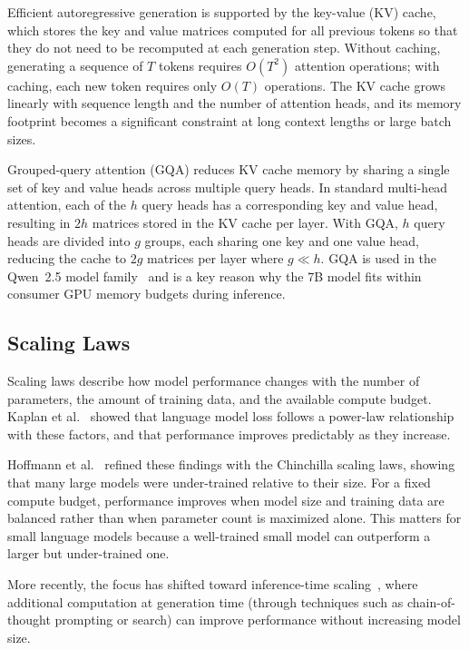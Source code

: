 Efficient autoregressive generation is supported by the key-value
(KV) cache, which stores the key and value matrices computed for all
previous tokens so that they do not need to be recomputed at each
generation step. Without caching, generating a sequence of $T$ tokens
requires $O(T^2)$ attention operations; with caching, each new token
requires only $O(T)$ operations. The KV cache grows linearly with
sequence length and the number of attention heads, and its memory
footprint becomes a significant constraint at long context lengths
or large batch sizes.

Grouped-query attention (GQA) reduces KV cache memory by sharing a
single set of key and value heads across multiple query heads. In
standard multi-head attention, each of the $h$ query heads has a
corresponding key and value head, resulting in $2h$ matrices stored
in the KV cache per layer. With GQA, $h$ query heads are divided into
$g$ groups, each sharing one key and one value head, reducing the
cache to $2g$ matrices per layer where $g \ll h$. GQA is used in the
Qwen~2.5 model family~\cite{qwen2024qwen25} and is a key reason why
the 7B model fits within consumer GPU memory budgets during inference.

\subsection{Scaling Laws}

Scaling laws describe how model performance changes with the number of parameters, the amount of training data, and the available compute budget. Kaplan et al.~\cite{kaplan2020scaling} showed that language model loss follows a power-law relationship with these factors, and that performance improves predictably as they increase.

Hoffmann et al.~\cite{hoffmann2022training} refined these findings with the Chinchilla scaling laws, showing that many large models were under-trained relative to their size. For a fixed compute budget, performance improves when model size and training data are balanced rather than when parameter count is maximized alone. This matters for small language models because a well-trained small model can outperform a larger but under-trained one.

More recently, the focus has shifted toward inference-time scaling~\cite{snell2024scaling}, where additional computation at generation time (through techniques such as chain-of-thought prompting or search) can improve performance without increasing model size.

